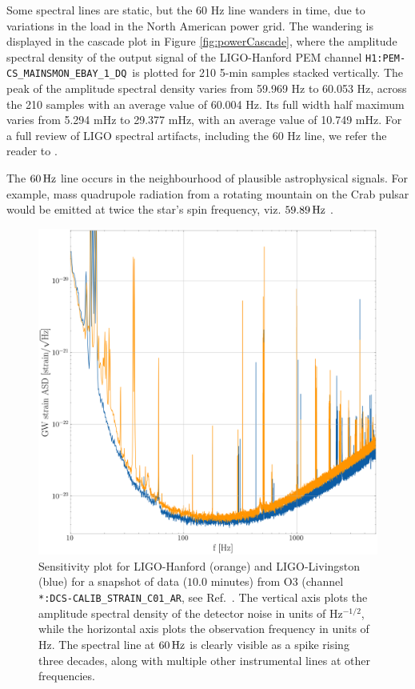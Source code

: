 \documentclass[pra,superscriptaddress,reprint,amsmath,amssymb,nofootinbib]{revtex4-2}
\newcommand{\CSOneName}{\texttt{H1:PEM-CS\_MAINSMON\_EBAY\_1\_DQ}}
\begin{document}
Some spectral lines are static, but the 60 Hz line wanders in time, due to variations in the load in the North American power grid. The wandering is displayed in the cascade plot in Figure \ref{fig:powerCascade}, where the amplitude spectral density of the output signal of the LIGO-Hanford PEM channel \CSOneName \, is plotted for 210 5-min samples stacked vertically. The peak of the amplitude spectral density varies from 59.969 Hz  to 60.053 Hz, across the 210 samples with an average value of 60.004 Hz. Its full width half maximum varies from 5.294 mHz to 29.377 mHz, with an average value of 10.749  mHz. For a full review of LIGO spectral artifacts, including the 60 Hz line, we refer the reader to \cite{CovasEtAl:2018}. \newline 

The $60 \, {\rm Hz}$ line occurs in the neighbourhood of plausible astrophysical signals. For example, mass quadrupole radiation from a rotating mountain on the Crab pulsar would be emitted at twice the star's spin frequency, viz. $59.89 \, {\rm Hz}$ \cite{psrqpy}.
\begin{figure}
	\begin{center}
		\includegraphics[width=\columnwidth]{images/sensitivity_sq}
	\end{center}
	\caption{Sensitivity plot for LIGO-Hanford (orange) and LIGO-Livingston (blue) for a snapshot of data ($10.0$ minutes) from O3 (channel \texttt{*:DCS-CALIB\_STRAIN\_C01\_AR}, see Ref.~\cite{LIGO_O3, GWOSC:online}. The vertical axis plots the amplitude spectral density of the detector noise in units of Hz$^{-1/2}$, while the horizontal axis plots the observation frequency in units of Hz. The spectral line at $60\,{\rm Hz}$ is clearly visible as a spike rising three decades, along with multiple other instrumental lines at other frequencies.}\label{fig:strainSensitivity}
\end{figure}
\end{document}
